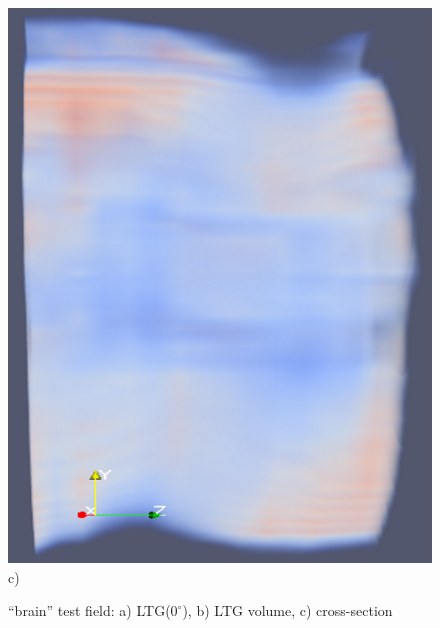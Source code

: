\documentclass{scrartcl}
\begin{document}
\begin{figure}[!t]
\begin{minipage}{0.3\textwidth}
    \includegraphics[width=\textwidth]{img_new/brain_cross-section.PNG}
    c)
    \label{b)}
  \end{minipage}
  \caption{\enquote{brain} test field: a) LTG($0^\circ$), b) LTG volume, c) cross-section}
\label{heart-ftle}
\end{figure}
\end{document}
